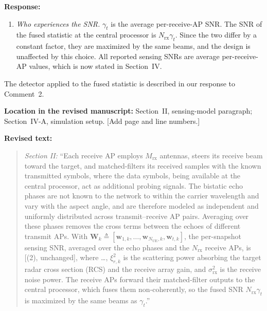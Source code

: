 \documentclass[a4paper,12pt]{article}
\newenvironment{response}{\par\textbf{Response:}\par}{\par}
\newcommand{\revisionlocation}[1]{\par\textbf{Location in the revised manuscript:} #1\par}
\newenvironment{revisedtext}{%
  \par\textbf{Revised text:}\begin{quote}\color{red}
}{\end{quote}}
\begin{document}
\begin{response}
\begin{enumerate}
\begin{equation*}
  \gamma_r=\frac{1}{\sigma_{\mathrm{rx}}^2}\sum_{k=1}^{N_{\mathrm{tx}}}\xi_{r,k}^2g_{r,k}\left\|\mathbf{a}^H(\phi_k)\mathbf{W}_k\right\|_F^2,
  \end{equation*}
  and (2) is its average $\gamma_t=\frac{1}{N_{\mathrm{rx}}}\sum_r\gamma_r$.
  \item \emph{Who experiences the SNR.} $\gamma_t$ is the average
  per-receive-AP SNR. The SNR of the fused statistic at the central
  processor is $N_{\mathrm{rx}}\gamma_t$. Since the two differ by a constant
  factor, they are maximized by the same beams, and the design is unaffected
  by this choice. All reported sensing SNRs are average per-receive-AP
  values, which is now stated in Section~IV.
\end{enumerate}
The detector applied to the fused statistic is described in our response to
Comment~2.
\end{response}
\revisionlocation{Section~II, sensing-model paragraph; Section~IV-A,
simulation setup. [Add page and line numbers.]}
\begin{revisedtext}
\textit{Section II:} ``Each receive AP employs $M_{\mathrm{rx}}$ antennas,
steers its receive beam toward the target, and matched-filters its received
samples with the known transmitted symbols, where the data symbols, being
available at the central processor, act as additional probing signals. The
bistatic echo phases are not known to the network to within the carrier
wavelength and vary with the aspect angle, and are therefore modeled as
independent and uniformly distributed across transmit--receive AP pairs.
Averaging over these phases removes the cross terms between the echoes of
different transmit APs. With
$\mathbf{W}_k\triangleq[\mathbf{w}_{1,k},\ldots,\mathbf{w}_{N_{\mathrm{UE}},k},\mathbf{w}_{t,k}]$,
the per-snapshot sensing SNR, averaged over the echo phases and the
$N_{\mathrm{rx}}$ receive APs, is [(2), unchanged], where \ldots,
$\xi_{r,k}^2$ is the scattering power absorbing the target radar cross
section (RCS) and the receive array gain, and $\sigma_{\mathrm{rx}}^2$ is the
receive noise power. The receive APs forward their matched-filter outputs to
the central processor, which fuses them non-coherently, so the fused SNR
$N_{\mathrm{rx}}\gamma_t$ is maximized by the same beams as $\gamma_t$.''
\end{revisedtext}
\end{document}
